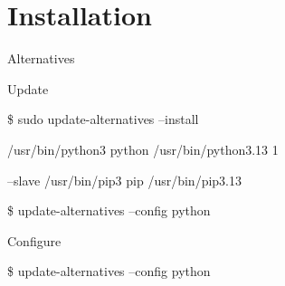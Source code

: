 \documentclass[10pt,compress]{beamer}
\begin{document}
\section{Installation}
\begin{frame}{Alternatives}
    \begin{alertblock}{Update}
        \begin{semiverbatim}
            {\small

            \$ sudo update-alternatives --install \ 

            /usr/bin/python3 python /usr/bin/python3.13 1 \
            
            --slave /usr/bin/pip3 pip /usr/bin/pip3.13

            \$ update-alternatives --config python
            }
        \end{semiverbatim}
    \end{alertblock}
    
    \begin{alertblock}{Configure}
        \begin{semiverbatim}
            {\small
            \$ update-alternatives --config python
            }
        \end{semiverbatim}
    \end{alertblock}
\end{frame}
\end{document}
